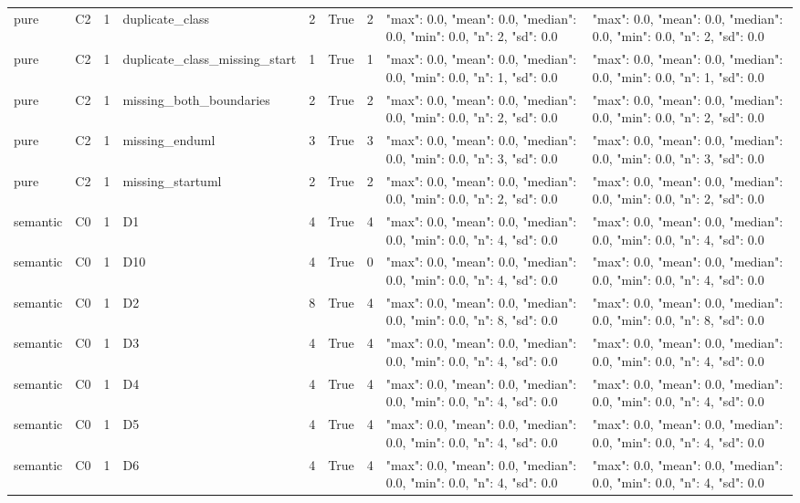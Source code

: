 \begin{tabular}{lllllllll}
pure & C2 & 1 & duplicate\_class & 2 & True & 2 & {"max": 0.0, "mean": 0.0, "median": 0.0, "min": 0.0, "n": 2, "sd": 0.0} & {"max": 0.0, "mean": 0.0, "median": 0.0, "min": 0.0, "n": 2, "sd": 0.0} \\
pure & C2 & 1 & duplicate\_class\_missing\_start & 1 & True & 1 & {"max": 0.0, "mean": 0.0, "median": 0.0, "min": 0.0, "n": 1, "sd": 0.0} & {"max": 0.0, "mean": 0.0, "median": 0.0, "min": 0.0, "n": 1, "sd": 0.0} \\
pure & C2 & 1 & missing\_both\_boundaries & 2 & True & 2 & {"max": 0.0, "mean": 0.0, "median": 0.0, "min": 0.0, "n": 2, "sd": 0.0} & {"max": 0.0, "mean": 0.0, "median": 0.0, "min": 0.0, "n": 2, "sd": 0.0} \\
pure & C2 & 1 & missing\_enduml & 3 & True & 3 & {"max": 0.0, "mean": 0.0, "median": 0.0, "min": 0.0, "n": 3, "sd": 0.0} & {"max": 0.0, "mean": 0.0, "median": 0.0, "min": 0.0, "n": 3, "sd": 0.0} \\
pure & C2 & 1 & missing\_startuml & 2 & True & 2 & {"max": 0.0, "mean": 0.0, "median": 0.0, "min": 0.0, "n": 2, "sd": 0.0} & {"max": 0.0, "mean": 0.0, "median": 0.0, "min": 0.0, "n": 2, "sd": 0.0} \\
semantic & C0 & 1 & D1 & 4 & True & 4 & {"max": 0.0, "mean": 0.0, "median": 0.0, "min": 0.0, "n": 4, "sd": 0.0} & {"max": 0.0, "mean": 0.0, "median": 0.0, "min": 0.0, "n": 4, "sd": 0.0} \\
semantic & C0 & 1 & D10 & 4 & True & 0 & {"max": 0.0, "mean": 0.0, "median": 0.0, "min": 0.0, "n": 4, "sd": 0.0} & {"max": 0.0, "mean": 0.0, "median": 0.0, "min": 0.0, "n": 4, "sd": 0.0} \\
semantic & C0 & 1 & D2 & 8 & True & 4 & {"max": 0.0, "mean": 0.0, "median": 0.0, "min": 0.0, "n": 8, "sd": 0.0} & {"max": 0.0, "mean": 0.0, "median": 0.0, "min": 0.0, "n": 8, "sd": 0.0} \\
semantic & C0 & 1 & D3 & 4 & True & 4 & {"max": 0.0, "mean": 0.0, "median": 0.0, "min": 0.0, "n": 4, "sd": 0.0} & {"max": 0.0, "mean": 0.0, "median": 0.0, "min": 0.0, "n": 4, "sd": 0.0} \\
semantic & C0 & 1 & D4 & 4 & True & 4 & {"max": 0.0, "mean": 0.0, "median": 0.0, "min": 0.0, "n": 4, "sd": 0.0} & {"max": 0.0, "mean": 0.0, "median": 0.0, "min": 0.0, "n": 4, "sd": 0.0} \\
semantic & C0 & 1 & D5 & 4 & True & 4 & {"max": 0.0, "mean": 0.0, "median": 0.0, "min": 0.0, "n": 4, "sd": 0.0} & {"max": 0.0, "mean": 0.0, "median": 0.0, "min": 0.0, "n": 4, "sd": 0.0} \\
semantic & C0 & 1 & D6 & 4 & True & 4 & {"max": 0.0, "mean": 0.0, "median": 0.0, "min": 0.0, "n": 4, "sd": 0.0} & {"max": 0.0, "mean": 0.0, "median": 0.0, "min": 0.0, "n": 4, "sd": 0.0} \\

\end{tabular}
